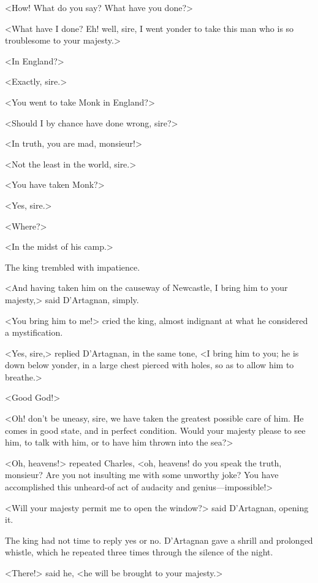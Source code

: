 <How! What do you say? What have you done?>

<What have I done? Eh! well, sire, I went yonder to take this man who is so troublesome to your majesty.>

<In England?>

<Exactly, sire.>

<You went to take Monk in England?>

<Should I by chance have done wrong, sire?>

<In truth, you are mad, monsieur!>

<Not the least in the world, sire.>

<You have taken Monk?>

<Yes, sire.>

<Where?>

<In the midst of his camp.>

The king trembled with impatience.

<And having taken him on the causeway of Newcastle, I bring him to your majesty,> said D'Artagnan, simply.

<You bring him to me!> cried the king, almost indignant at what he considered a mystification.

<Yes, sire,> replied D'Artagnan, in the same tone, <I bring him to you; he is down below yonder, in a large chest pierced with holes, so as to allow him to breathe.>

<Good God!>

<Oh! don't be uneasy, sire, we have taken the greatest possible care of him. He comes in good state, and in perfect condition. Would your majesty please to see him, to talk with him, or to have him thrown into the sea?>

<Oh, heavens!> repeated Charles, <oh, heavens! do you speak the truth, monsieur? Are you not insulting me with some unworthy joke? You have accomplished this unheard-of act of audacity and genius—impossible!>

<Will your majesty permit me to open the window?> said D'Artagnan, opening it.

The king had not time to reply yes or no. D'Artagnan gave a shrill and prolonged whistle, which he repeated three times through the silence of the night.

<There!> said he, <he will be brought to your majesty.> 